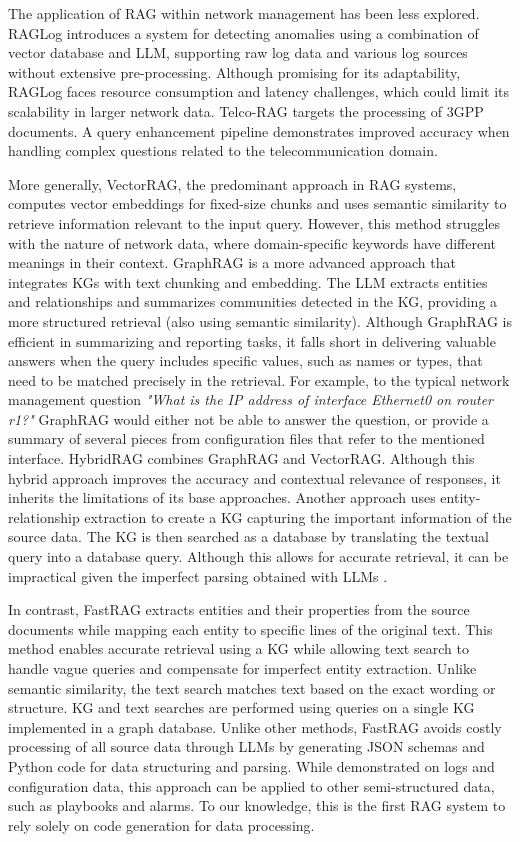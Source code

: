 \documentclass[conference]{IEEEtran}
\begin{document}
The application of RAG within network management has been less explored. RAGLog \cite{pan2023RagLog} introduces a system for detecting anomalies using a combination of vector database and LLM, supporting raw log data and various log sources without extensive pre-processing. Although promising for its adaptability, RAGLog faces resource consumption and latency challenges, which could limit its scalability in larger network data.
Telco-RAG \cite{bornea2024TelcoRag} targets the processing of 3GPP documents. A query enhancement pipeline demonstrates improved accuracy when handling complex questions related to the telecommunication domain. 

More generally, VectorRAG, the predominant approach in RAG systems, computes vector embeddings for fixed-size chunks and uses semantic similarity to retrieve information relevant to the input query. However, this method struggles with the nature of network data, where domain-specific keywords have different meanings in their context. 
%
GraphRAG \cite{edge2024GraphRag} is a more advanced approach that integrates KGs with text chunking and embedding. The LLM extracts entities and relationships and summarizes communities detected in the KG, providing a more structured retrieval (also using semantic similarity). 
Although GraphRAG is efficient in summarizing and reporting tasks, it falls short in delivering valuable answers when the query includes specific values, such as names or types, that need to be matched precisely in the retrieval. 
For example, to the typical network management question \textit{"What is the IP address of interface Ethernet0 on router r1?"} GraphRAG would either not be able to answer the question, or provide a summary of several pieces from configuration files that refer to the mentioned interface.
%
HybridRAG \cite{sarmah2024HybridRag} combines GraphRAG and VectorRAG. Although this hybrid approach improves the accuracy and contextual relevance of responses, it inherits the limitations of its base approaches. 
%
Another approach uses entity-relationship extraction to create a KG capturing the important information of the source data. The KG is then searched as a database by translating the textual query into a database query. Although this allows for accurate retrieval, it can be impractical given the imperfect parsing obtained with LLMs \cite{llm_accuracy}.

In contrast, FastRAG extracts entities and their properties from the source documents while mapping each entity to specific lines of the original text. This method enables accurate retrieval using a KG while allowing text search to handle vague queries and compensate for imperfect entity extraction. Unlike semantic similarity, the text search matches text based on the exact wording or structure. KG and text searches are performed using queries on a single KG implemented in a graph database. 
Unlike other methods, FastRAG avoids costly processing of all source data through LLMs by generating JSON schemas and Python code for data structuring and parsing. 
While demonstrated on logs and configuration data, this approach can be applied to other semi-structured data, such as playbooks and alarms. 
To our knowledge, this is the first RAG system to rely solely on code generation for data processing.
\end{document}
